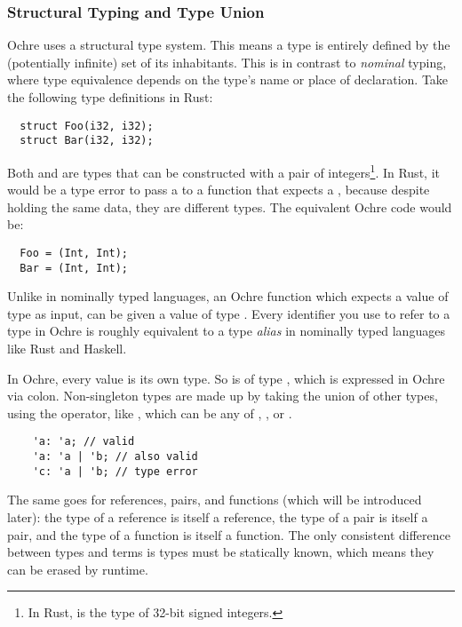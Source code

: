 \documentclass[12pt,twoside]{report}
\begin{document}
\subsubsection{Structural Typing and Type Union}
Ochre uses a structural type system. This means a type is entirely defined by the (potentially infinite) set of its inhabitants. This is in contrast to \textit{nominal} typing, where type equivalence depends on the type's name or place of declaration. Take the following type definitions in Rust:

\begin{verbatim}
  struct Foo(i32, i32);
  struct Bar(i32, i32);
\end{verbatim}

\noindent
Both  and  are types that can be constructed with a pair of integers\footnote{In Rust,  is the type of 32-bit signed integers.}. In Rust, it would be a type error to pass a  to a function that expects a , because despite holding the same data, they are different types. The equivalent Ochre code would be:

\begin{verbatim}
  Foo = (Int, Int);
  Bar = (Int, Int);
\end{verbatim}

Unlike in nominally typed languages, an Ochre function which expects a value of type  as input, can be given a value of type . Every identifier you use to refer to a type in Ochre is roughly equivalent to a type \textit{alias} in nominally typed languages like Rust and Haskell.

In Ochre, every value is its own type. So  is of type , which is expressed in Ochre via colon. Non-singleton types are made up by taking the union of other types, using the \mono{|} operator, like , which can be any of , , or .

  \begin{verbatim}
    'a: 'a; // valid
    'a: 'a | 'b; // also valid
    'c: 'a | 'b; // type error
  \end{verbatim}

The same goes for references, pairs, and functions (which will be introduced later): the type of a reference is itself a reference, the type of a pair is itself a pair, and the type of a function is itself a function. The only consistent difference between types and terms is types must be statically known, which means they can be erased by runtime.
\end{document}
